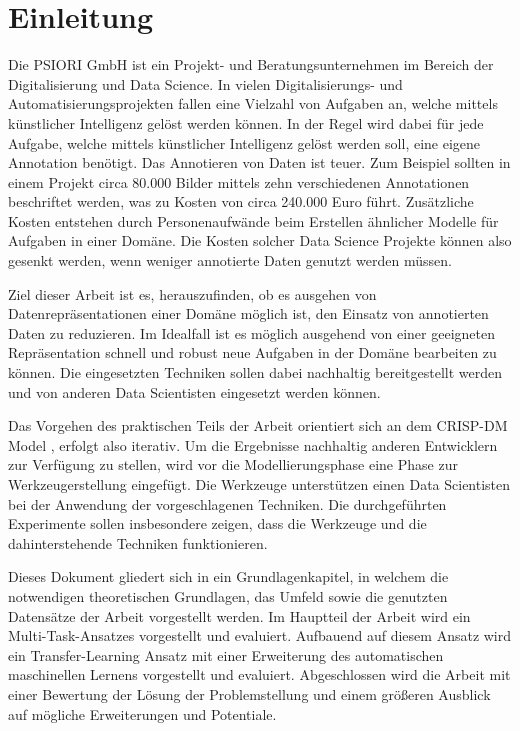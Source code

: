 \listoftodos

\chapter{Einleitung}
\label{chap:Einleitung}
	Die PSIORI GmbH \cite{PSIORIGmbH.2020} ist ein Projekt- und Beratungsunternehmen im Bereich der Digitalisierung und Data Science. In vielen Digitalisierungs- und Automatisierungsprojekten fallen eine Vielzahl von Aufgaben an, welche mittels künstlicher Intelligenz gelöst werden können. In der Regel wird dabei für jede Aufgabe, welche mittels künstlicher Intelligenz gelöst werden soll, eine eigene Annotation benötigt. Das Annotieren von Daten ist teuer. Zum Beispiel sollten in einem Projekt circa 80.000 Bilder mittels zehn verschiedenen Annotationen beschriftet werden, was zu Kosten von circa 240.000 Euro führt. Zusätzliche Kosten entstehen durch Personenaufwände beim Erstellen ähnlicher Modelle für Aufgaben in einer Domäne. Die Kosten solcher Data Science Projekte können also gesenkt werden, wenn weniger annotierte Daten genutzt werden müssen.
	
	Ziel dieser Arbeit ist es, herauszufinden, ob es ausgehen von Datenrepräsentationen einer Domäne möglich ist, den Einsatz von annotierten Daten zu reduzieren. Im Idealfall ist es möglich ausgehend von einer geeigneten Repräsentation schnell und robust neue Aufgaben in der Domäne bearbeiten zu können. Die eingesetzten Techniken sollen dabei nachhaltig bereitgestellt werden und von anderen Data Scientisten eingesetzt werden können. 
	
	Das Vorgehen des praktischen Teils der Arbeit orientiert sich an dem CRISP-DM Model \cite{Shearer.2000}, erfolgt also iterativ. Um die Ergebnisse nachhaltig anderen Entwicklern zur Verfügung zu stellen, wird vor die Modellierungsphase eine Phase zur Werkzeugerstellung eingefügt. Die Werkzeuge unterstützen einen Data Scientisten bei der Anwendung der vorgeschlagenen Techniken. Die durchgeführten Experimente sollen insbesondere zeigen, dass die Werkzeuge und die dahinterstehende Techniken funktionieren. 
	
	Dieses Dokument gliedert sich in ein Grundlagenkapitel, in welchem die notwendigen theoretischen Grundlagen, das Umfeld sowie die genutzten Datensätze der Arbeit vorgestellt werden. Im Hauptteil der Arbeit wird ein Multi-Task-Ansatzes vorgestellt und evaluiert. Aufbauend auf diesem Ansatz wird ein Transfer-Learning Ansatz mit einer Erweiterung des automatischen maschinellen Lernens vorgestellt und evaluiert. Abgeschlossen wird die Arbeit mit einer Bewertung der Lösung der Problemstellung und einem größeren Ausblick auf mögliche Erweiterungen und Potentiale.
